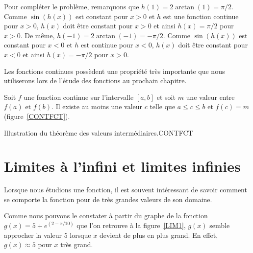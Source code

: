 {\begin{egg}[\theory]
Pour compléter le problème, remarquons que
$h(1) = 2\arctan(1) = \pi/2$.  Comme $\sin(h(x))$ est constant pour
$x>0$ et $h$ est une fonction continue pour $x>0$, $h(x)$ doit être
constant pour $x>0$ et ainsi $h(x) = \pi/2$ pour $x>0$.  De même,
$h(-1) = 2\arctan(-1) = -\pi/2$.  Comme $\sin(h(x))$ est constant pour
$x<0$ et $h$ est continue pour $x<0$, $h(x)$ doit être constant pour
$x<0$ et ainsi $h(x) = -\pi/2$ pour $x>0$.
\end{egg}



Les fonctions continues possèdent une propriété très importante que
nous utiliserons lors de l'étude des fonctions au prochain chapitre.

\begin{focus}{\thm}
Soit $f$ une fonction continue sur l'intervalle $[a,b]$ et soit $m$
une valeur entre $f(a)$ et $f(b)$.  Il existe au moins une valeur $c$
telle que  $a\leq c \leq b$ et $f(c) = m$ (figure~\ref{CONTFCT}).
\label{TVI}
\end{focus}

{Illustration du théorème des valeurs intermédiaires.}{CONTFCT}

\section{Limites à l'infini et limites infinies}

Lorsque nous étudions une fonction, il est souvent intéressant de savoir
comment se comporte la fonction pour de très grandes valeurs de son
domaine.

\begin{egg}
Comme nous pouvons le constater à partir du graphe de la fonction
$\displaystyle g(x) = 5 + e^{(2 - x/10)}$ que l'on retrouve à la
figure~\ref{LIM1}, $g(x)$ semble approcher la valeur $5$ lorsque $x$
devient de plus en plus grand.  En effet, $g(x) \approx 5$ pour $x$
très grand.
\end{egg}

}
